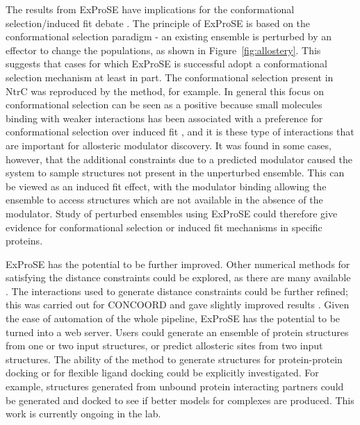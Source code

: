 The results from ExProSE have implications for the conformational selection/induced fit debate \cite{Boehr2009}.
The principle of ExProSE is based on the conformational selection paradigm - an existing ensemble is perturbed by an effector to change the populations, as shown in Figure~\ref{fig:allostery}.
This suggests that cases for which ExProSE is successful adopt a conformational selection mechanism at least in part.
The conformational selection present in NtrC was reproduced by the method, for example.
In general this focus on conformational selection can be seen as a positive because small molecules binding with weaker interactions has been associated with a preference for conformational selection over induced fit \cite{Okazaki2008}, and it is these type of interactions that are important for allosteric modulator discovery.
It was found in some cases, however, that the additional constraints due to a predicted modulator caused the system to sample structures not present in the unperturbed ensemble.
This can be viewed as an induced fit effect, with the modulator binding allowing the ensemble to access structures which are not available in the absence of the modulator.
Study of perturbed ensembles using ExProSE could therefore give evidence for conformational selection or induced fit mechanisms in specific proteins.

ExProSE has the potential to be further improved.
Other numerical methods for satisfying the distance constraints could be explored, as there are many available \cite{DeBakker2006}.
The interactions used to generate distance constraints could be further refined; this was carried out for CONCOORD and gave slightly improved results \cite{DeGroot1999}.
Given the ease of automation of the whole pipeline, ExProSE has the potential to be turned into a web server.
Users could generate an ensemble of protein structures from one or two input structures, or predict allosteric sites from two input structures.
The ability of the method to generate structures for protein-protein docking or for flexible ligand docking could be explicitly investigated.
For example, structures generated from unbound protein interacting partners could be generated and docked to see if better models for complexes are produced.
This work is currently ongoing in the lab.

